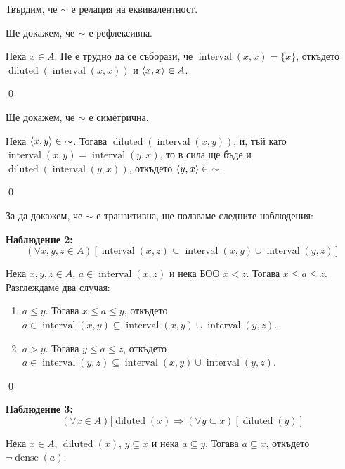 \begin{problem}
\quad
Твърдим, че $\sim$ е релация на еквивалентност.

\quad
Ще докажем, че $\sim$ е рефлексивна.

\begin{tcolorbox}[mybox, title={Доказателство:}]
\quad
Нека $x \in A$. Не е трудно да се съборази, че $\operatorname{interval}(x, x) = \{x\}$,
откъдето $\operatorname{diluted}(\operatorname{interval}(x, x))$ и $\langle x, x \rangle \in A$.

\qed
\end{tcolorbox}

\quad
Ще докажем, че $\sim$ е симетрична.

\begin{tcolorbox}[mybox, title={Доказателство:}]
\quad
Нека $\langle x, y \rangle \in\ \sim$. Тогава $\operatorname{diluted}(\operatorname{interval}(x, y))$,
и, тъй като $\operatorname{interval}(x, y) = \operatorname{interval}(y, x)$, то в сила ще бъде и
$\operatorname{diluted}(\operatorname{interval}(y, x))$, откъдето $\langle y, x \rangle \in\ \sim$.

\qed
\end{tcolorbox}

\quad
За да докажем, че $\sim$ е транзитивна, ще ползваме следните наблюдения:

\smallbreak
\quad
\textbf{Наблюдение 2:}
\[
(\forall x, y, z \in A) [\operatorname{interval}(x, z) \subseteq \operatorname{interval}(x, y) \cup \operatorname{interval}(y, z)]
\]

\begin{tcolorbox}[mybox, title={Доказателство:}]
\quad
Нека $x, y, z \in A$, $a \in \operatorname{interval}(x, z)$ и нека БОО $x < z$. Тогава $x \le a \le z$.
Разглеждаме два случая:
\begin{enumerate}[label={\arabic* сл.}]
\item
$a \le y$. Тогава $x \le a \le y$, откъдето
$a \in \operatorname{interval}(x, y) \subseteq \operatorname{interval}(x, y) \cup \operatorname{interval}(y, z)$.

\item
$a > y$. Тогава $y \le a \le z$, откъдето
$a \in \operatorname{interval}(y, z) \subseteq \operatorname{interval}(x, y) \cup \operatorname{interval}(y, z)$.


\end{enumerate}

\qed
\end{tcolorbox}

\quad
\textbf{Наблюдение 3:}
\[
(\forall x \in A) [\operatorname{diluted}(x) \Rightarrow (\forall y \subseteq x) [\operatorname{diluted}(y)]
\]
\begin{tcolorbox}[mybox, title={Доказателство:}]
\quad
Нека $x \in A$, $\operatorname{diluted}(x)$, $y \subseteq x$ и нека $a \subseteq y$.
Тогава $a \subseteq x$, откъдето $\neg \operatorname{dense}(a)$.


\end{tcolorbox}
\end{problem}
